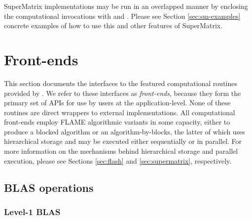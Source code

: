SuperMatrix implementations may be run in an overlapped manner by enclosing
the computational invocations with \flashqueuebegin and
\flashqueueendns.
Please see Section \ref{sec:sm-examples} concrete examples of how to
use this and other features of SuperMatrix.










\section{Front-ends}
\label{sec:front-ends}





This section documents the interfaces to the featured computational routines 
provided by \libflamens.
We refer to these interfaces as {\em front-ends}, because they form the
primary set of APIs for use by users at the application-level.
None of these routines are direct wrappers to external implementations.
All computational front-ends employ FLAME algorithmic variants in some
capacity, either to produce a blocked algorithm or an algorithm-by-blocks,
the latter of which uses hierarchical storage and may be executed either
sequentially or in parallel.
For more information on the mechanisms behind hierarchical storage and
parallel execution, please see
Sections \ref{sec:flash} and \ref{sec:supermatrix}, respectively.

\subsection{BLAS operations}



\subsubsection{Level-1 BLAS}


